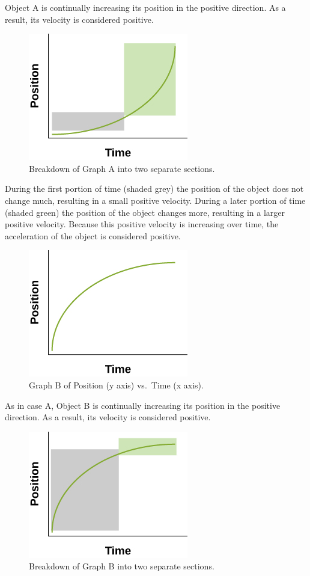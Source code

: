 \documentclass[
]{book}
\newenvironment{note}{}{}
\begin{document}
\begin{note}
Object A is continually increasing its position in the positive
direction. As a result, its velocity is considered positive.

\begin{figure}
\hypertarget{fs-id1850704}{%
\centering
\includegraphics{images/Figure_Ch2_M4_09.jpg}
\caption{Breakdown of Graph A into two separate
sections.}\label{fs-id1850704}
}
\end{figure}

During the first portion of time (shaded grey) the position of the
object does not change much, resulting in a small positive velocity.
During a later portion of time (shaded green) the position of the object
changes more, resulting in a larger positive velocity. Because this
positive velocity is increasing over time, the acceleration of the
object is considered positive.

\begin{figure}
\hypertarget{fs-id3207940}{%
\centering
\includegraphics{images/Figure_Ch2_M4_10.jpg}
\caption{Graph B of Position (y axis) vs.~Time (x
axis).}\label{fs-id3207940}
}
\end{figure}

As in case A, Object B is continually increasing its position in the
positive direction. As a result, its velocity is considered positive.

\begin{figure}
\hypertarget{fs-id3195153}{%
\centering
\includegraphics{images/Figure_Ch2_M4_11.jpg}
\caption{Breakdown of Graph B into two separate
sections.}\label{fs-id3195153}
}
\end{figure}


\end{note}
\end{document}
